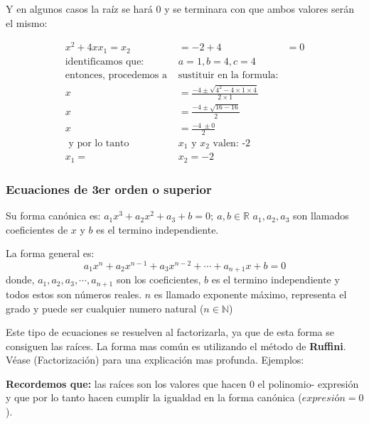     Y en algunos casos la raíz se hará 0 y se terminara con que ambos valores
    serán el mismo:

    \begin{align*}
        x^2 +4x x_1=x_2&=-2+4 &= 0		\\
        \text{identificamos que: }& a=1,b=4,c=4\\
        \text{entonces, procedemos a }&\text{sustituir en la formula:}\\
        x &= \frac{-4\pm \sqrt{4^2-4\times1\times4}}{2\times1}\\
        x &= \frac{-4 \pm \sqrt{ 16 - 16}}{2} \\
        x &= \frac{-4\ \pm 0}{2}\\
        \text{ y por lo tanto }&\text{$x_1$ y $x_2$ valen: -2}\\
        x_1=&x_2=-2
    \end{align*}




    \subsubsection*{Ecuaciones de 3er orden o superior} \label{Ecuaciones-de-3er-orden-o-superior}
    Su forma canónica es: $a_1x^3+a_2x^2+a_3+b=0;\ a,b\in\mathbb{R}$ $a_1,a_2,a_3$ son
    llamados coeficientes  de $x$ y $b$ es el termino independiente.

    La forma general es:
    $$a_1x^n+a_2x^{n-1}+a_3x^{n-2}+\cdots+a_{n+1}x+b = 0$$
    donde, $a_1,a_2,a_3,\cdots,a_{n+1}$ son los coeficientes, $b$ es el termino
    independiente y todos estos son números reales. $n$ es llamado exponente máximo,
    representa el grado y puede ser cualquier numero natural ($n \in \mathbb{N}$)


    Este tipo de ecuaciones se resuelven al factorizarla, ya que de esta forma
    se consiguen las raíces. La forma mas común es utilizando el método
    de \textbf{Ruffini}. Véase (\refname{Factorización}) para una explicación
    mas profunda.
    Ejemplos:

    \textbf{Recordemos que:} las raíces son los valores que hacen 0 el polinomio-
    expresión y que por lo tanto hacen cumplir la igualdad en la forma canónica
    ($expresión=0$).

